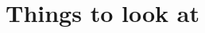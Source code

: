 \documentclass{article}
\theoremstyle{definition}
\begin{document}
\newpage

\section{Things to look at}

\begin{itemize}

\end{itemize}
\end{document}
